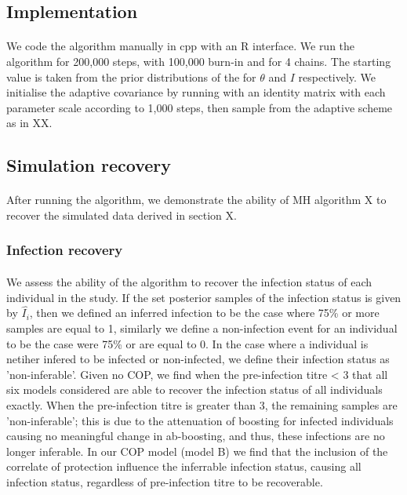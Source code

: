 \documentclass{article}
\begin{document}
\subsection{Implementation }
\paragraph{} We code the algorithm manually in cpp with an R interface. We run the algorithm for 200,000 steps, with 100,000 burn-in and for 4 chains. The starting value is taken from the prior distributions of the for $\theta$ and $I$ respectively. We initialise the adaptive covariance by running with an identity matrix with each parameter scale according to 1,000 steps, then sample from the adaptive scheme as in XX. 

\subsection{Simulation recovery }
\paragraph{} After running the algorithm, we demonstrate the ability of MH algorithm X to recover the simulated data derived in section X.

\subsubsection{Infection recovery}

\paragraph{}We assess the ability of the algorithm to recover the infection status of each individual in the study. If the set posterior samples of the infection status is given by $\hat{I_i}$, then we defined an inferred infection to be the case where 75\% or more samples are equal to 1, similarly we define a non-infection event for an individual to be the case were 75\% or are equal to 0. In the case where a individual is netiher infered to be infected or non-infected, we define their infection status as 'non-inferable'.  Given no COP, we find when the pre-infection titre < 3 that all six models considered are able to recover the infection status of all individuals exactly. When the pre-infection titre is greater than 3, the remaining samples are 'non-inferable'; this is due to the attenuation of boosting for infected individuals causing no meaningful change in ab-boosting, and thus, these infections are no longer inferable. In our COP model (model B) we find that the inclusion of the correlate of protection influence the inferrable infection status, causing all infection status, regardless of pre-infection titre to be recoverable. 
\end{document}
